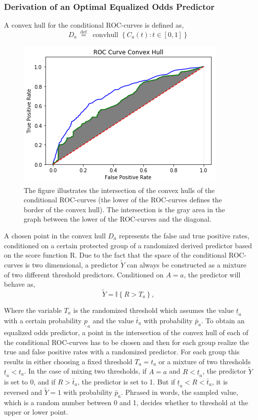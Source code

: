 \documentclass[11pt, fleqn, titlepage]{article}
\begin{document}
	\subsubsection{Derivation of an Optimal Equalized Odds Predictor} \label{optimalboi}
	A convex hull for the conditional ROC-curves is defined as, 
	\begin{equation*}\label{key}
	D_{a} \stackrel{\text { def }}{=} \text { convhull }\left\{C_{a}(t): t \in[0,1]\right\}
	\end{equation*}

	\begin{figure}[H]
		\centering
		\includegraphics[width=0.5\linewidth]{imgs/convex_hull}
		\caption{The figure illustrates the intersection of the convex hulls of the conditional ROC-curves (the lower of the ROC-curves defines the border of the convex hull). The intersection is the gray area in the graph between the lower of the ROC-curves and the diagonal.}
		\label{fig:convexhull}
	\end{figure}
	\noindent
	A chosen point in the convex hull $ D_a $ represents the false and true positive rates, conditioned on a certain protected group of a randomized derived predictor based on the score function R. Due to the fact that the space of the conditional ROC-curves is two dimensional, a predictor $ \tilde Y $ can always be constructed as a mixture of two different threshold predictors. Conditioned on $ A=a $, the predictor will behave as, 
	\begin{equation}\label{odds_pred}
	\widetilde{Y}=\mathbb{I}\left\{R>T_{a}\right\},
	\end{equation}
	
	\noindent Where the variable $ T_a $ is the randomized threshold which assumes the value $ \underline{t}_{a} $ with a certain probability $ \underline{p}_a $ and the value $\bar t_{a} $ with probability $ \bar p_a $. To obtain an equalized odds predictor, a point in the intersection of the convex hull of each of the conditional ROC-curves has to be chosen and then for each group realize the true and false positive rates with a randomized predictor. For each group this results in either choosing a fixed threshold $ T_a = t_a $ or a mixture of two thresholds $ \underline t_a < t_a $. In the case of mixing two thresholds, if $ A=a $ and $ R < \underline t_a $, the predictor $ \tilde Y $ is set to 0, and if $ R > \bar t_a $, the predictor is set to 1. But if $ \underline t_a < R < \bar t_a $, it is reversed and $ \tilde Y = 1 $ with probability $ \bar p_a$. Phrased in words, the sampled value, which is a random number between 0 and 1, decides whether to threshold at the upper or lower point.
	
\end{document}
